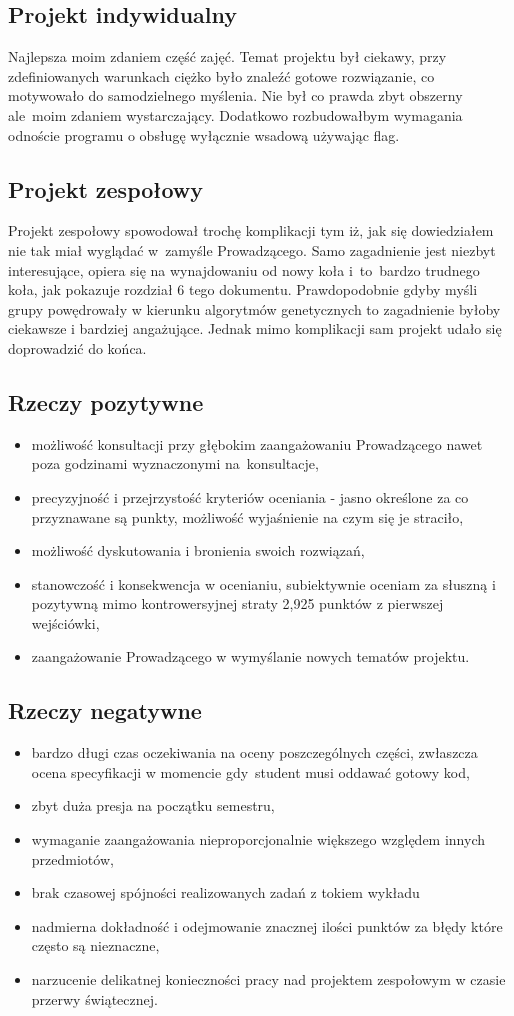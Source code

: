 \documentclass[a4paper,11pt]{article}
\begin{document}
\subsection{Projekt indywidualny}
Najlepsza moim zdaniem część zajęć. Temat projektu był ciekawy, przy zdefiniowanych warunkach ciężko było znaleźć gotowe rozwiązanie, co motywowało do samodzielnego myślenia. Nie był co prawda zbyt obszerny ale~moim zdaniem wystarczający. Dodatkowo rozbudowałbym wymagania odnoście programu o obsługę wyłącznie wsadową używając flag.
\subsection{Projekt zespołowy}
Projekt zespołowy spowodował trochę komplikacji tym iż, jak się dowiedziałem nie tak miał wyglądać w~zamyśle Prowadzącego. Samo zagadnienie jest niezbyt interesujące, opiera się na wynajdowaniu od nowy koła i~to~bardzo trudnego koła, jak pokazuje rozdział 6 tego dokumentu. Prawdopodobnie gdyby myśli grupy powędrowały w kierunku algorytmów genetycznych to zagadnienie byłoby ciekawsze i bardziej angażujące. Jednak mimo komplikacji sam projekt udało się doprowadzić do końca.
\subsection{Rzeczy pozytywne}
\begin{itemize}
\item możliwość konsultacji przy głębokim zaangażowaniu Prowadzącego nawet poza godzinami wyznaczonymi na~konsultacje,
\item precyzyjność i przejrzystość kryteriów oceniania - jasno określone za co przyznawane są punkty, możliwość wyjaśnienie na czym się je straciło,
\item możliwość dyskutowania i bronienia swoich rozwiązań,
\item stanowczość i konsekwencja w ocenianiu, subiektywnie oceniam za słuszną i pozytywną mimo kontrowersyjnej straty 2,925 punktów z pierwszej wejściówki,
\item zaangażowanie Prowadzącego w wymyślanie nowych tematów projektu.
\end{itemize}
\subsection{Rzeczy negatywne}
\begin{itemize}
\item bardzo długi czas oczekiwania na oceny poszczególnych części, zwłaszcza ocena specyfikacji w momencie gdy~student musi oddawać gotowy kod,
\item zbyt duża presja na początku semestru,
\item wymaganie zaangażowania nieproporcjonalnie większego względem innych przedmiotów,
\item brak czasowej spójności realizowanych zadań z tokiem wykładu
\item nadmierna dokładność i odejmowanie znacznej ilości punktów za błędy które często są nieznaczne,
\item narzucenie delikatnej konieczności pracy nad projektem zespołowym w czasie przerwy świątecznej.
\end{itemize}
\end{document}
